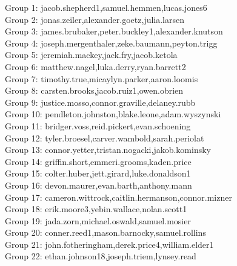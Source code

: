 \documentclass[10pt]{beamer}
\begin{document}
\begin{frame}
\footnotesize
Group 1: jacob.shepherd1,samuel.hemmen,lucas.jones6\\
Group 2: jonas.zeiler,alexander.goetz,julia.larsen\\
Group 3: james.brubaker,peter.buckley1,alexander.knutson\\
Group 4: joseph.mergenthaler,zeke.baumann,peyton.trigg\\
Group 5: jeremiah.mackey,jack.fry,jacob.ketola\\
Group 6: matthew.nagel,luka.derry,ryan.barrett2\\
Group 7: timothy.true,micaylyn.parker,aaron.loomis\\
Group 8: carsten.brooks,jacob.ruiz1,owen.obrien\\
Group 9: justice.mosso,connor.graville,delaney.rubb\\
Group 10: pendleton.johnston,blake.leone,adam.wyszynski\\
Group 11: bridger.voss,reid.pickert,evan.schoening\\
Group 12: tyler.broesel,carver.wambold,sarah.periolat\\
Group 13: connor.yetter,tristan.nogacki,jakob.kominsky\\
Group 14: griffin.short,emmeri.grooms,kaden.price\\
Group 15: colter.huber,jett.girard,luke.donaldson1\\
Group 16: devon.maurer,evan.barth,anthony.mann\\
Group 17: cameron.wittrock,caitlin.hermanson,connor.mizner\\
Group 18: erik.moore3,yebin.wallace,nolan.scott1\\
Group 19: jada.zorn,michael.oswald,samuel.mosier\\
Group 20: conner.reed1,mason.barnocky,samuel.rollins\\
Group 21: john.fotheringham,derek.price4,william.elder1\\
Group 22: ethan.johnson18,joseph.triem,lynsey.read\\
\end{frame}
\end{document}
